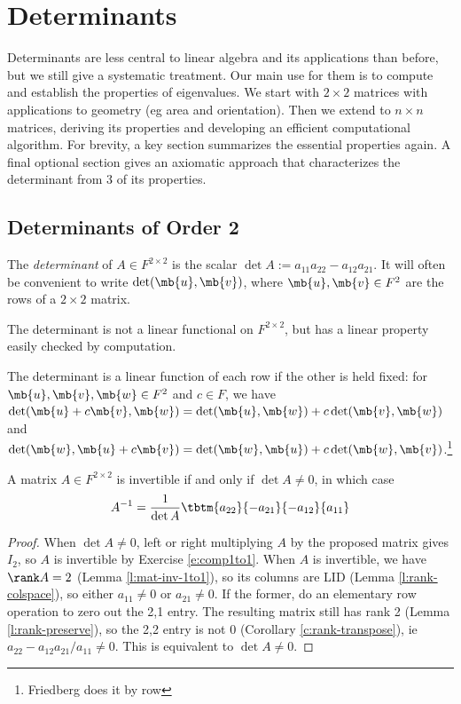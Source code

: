 \chapter{Determinants}
Determinants are less central to linear algebra and its applications than before, but we still give a systematic treatment. Our main use for them is to compute and establish the properties of eigenvalues. We start with $2 \times 2$ matrices with applications to geometry (eg area and orientation).
Then we extend to $n \times n$ matrices, deriving its properties and developing an efficient computational algorithm. For brevity, a key section summarizes the essential properties again. A final optional section gives an axiomatic approach that characterizes the determinant from 3 of its properties.

\section{Determinants of Order 2}
\begin{defn}
The \emph{determinant} of $A \in F^{2 \times 2}$ is the scalar $\det A:=a_{11}a_{22}-a_{12}a_{21}$. It will often be convenient to write $\det (\mb{u},\mb{v})$, where $\mb{u},\mb{v}\in F^2$ are the rows of a $2 \times 2$ matrix.
\end{defn}
The determinant is not a linear functional on $F^{2 \times 2}$, but has a linear property easily checked by computation.
\begin{lem}
The determinant is a linear function of each row if the other is held fixed: for $\mb{u},\mb{v},\mb{w}\in F^2$ and $c \in F$, we have $\det (\mb{u}+c \mb{v},\mb{w})= \det (\mb{u},\mb{w})+c \det (\mb{v},\mb{w})$ and $\det (\mb{w},\mb{u}+c \mb{v})= \det (\mb{w},\mb{u})+c \det (\mb{w},\mb{v})$.\footnote{Friedberg does it by row}
\end{lem}
\begin{lem}
A matrix $A \in F^{2 \times 2}$ is invertible if and only if $\det A \neq 0$, in which case
\[ A^{-1}= \frac{1}{\det A}\tbtm{a_{22}}{-a_{21}}{-a_{12}}{a_{11}}\]
\end{lem}
\begin{proof}
When $\det A \neq 0$, left or right multiplying $A$ by the proposed matrix gives $I_2$, so $A$ is invertible by Exercise \ref{e:comp1to1}.
When $A$ is invertible, we have $\rank A=2$ (Lemma \ref{l:mat-inv-1to1}), so its columns are LID (Lemma \ref{l:rank-colspace}), so either $a_{11}\neq 0$ or $a_{21}\neq 0$. If the former, do an elementary row operation to zero out the 2,1 entry. The resulting matrix still has rank 2 (Lemma \ref{l:rank-preserve}), so the 2,2 entry is not 0 (Corollary \ref{c:rank-transpose}), ie $a_{22}-a_{12}a_{21}/a_{11}\neq 0$. This is equivalent to $\det A \neq 0$.
\end{proof}
